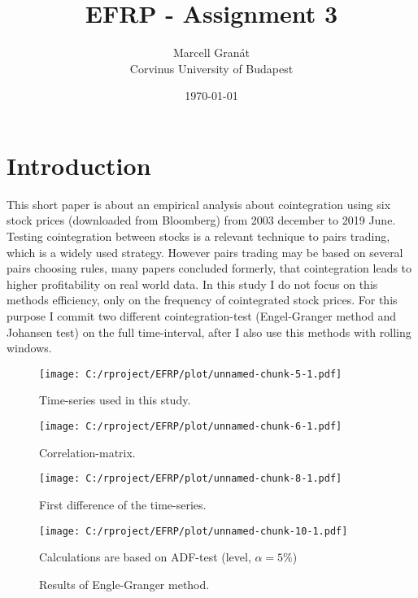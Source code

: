 \documentclass[12pt, a4paper, twoside, titlepage]{article}
\title{EFRP - Assignment 3}
\date{\today}
\author{Marcell Granát \\ Corvinus University of Budapest}
\begin{document}
  \maketitle
  \tableofcontents
  

\section*{Introduction}
\setcounter{page}{1}

This short paper is about an empirical analysis about cointegration using six stock prices (downloaded from Bloomberg) from 2003 december to 2019 June. Testing cointegration between stocks is a relevant technique to pairs trading, which is a widely used strategy. However pairs trading may be based on several pairs choosing rules, many papers concluded formerly, that cointegration leads to higher profitability on real world data. In this study I do not focus on this methods efficiency, only on the frequency of cointegrated stock prices. For this purpose I commit two different cointegration-test (Engel-Granger method and Johansen test) on the full time-interval, after I also use this methods with rolling windows.

\begin{figure}[ht]
  \centering
  \texttt{[image: C:/rproject/EFRP/plot/unnamed-chunk-5-1.pdf]}
  \label{fig1}
  \caption{Time-series used in this study.}
\end{figure}

\begin{figure}[ht]
  \centering
  \texttt{[image: C:/rproject/EFRP/plot/unnamed-chunk-6-1.pdf]}
  \label{fig2}
  \caption{Correlation-matrix.}
\end{figure}

\begin{figure}[ht]
  \centering
  \texttt{[image: C:/rproject/EFRP/plot/unnamed-chunk-8-1.pdf]}
  \label{fig3}
  \caption{First difference of the time-series.}
\end{figure}

\begin{figure}[ht]
  \centering
  \texttt{[image: C:/rproject/EFRP/plot/unnamed-chunk-10-1.pdf]}
  \label{fig4}
  \caption{Results of Engle-Granger method.}
  Calculations are based on ADF-test (level, $\alpha = 5\%$)
\end{figure}
\end{document}
